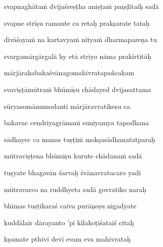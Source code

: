 svapnaghāta\.m dvijaśreṣṭha aniṣṭa\.m paṇḍitaiḥ sadā \veg\dontdisplaylinenum

svapne strīṣu ramante ca retaḥ prakṣarate tataḥ\thinspace{\dandab} \dontdisplaylinenum

divāśaya\.m na kartavya\.m nitya\.m dharmapareṇa tu \veg\dontdisplaylinenum 

svargamārgārgalā hy etā striyo nāma prakīrtitāḥ\thinspace{\dandab} \dontdisplaylinenum


mārjārakabakaśvānagomahīvratapañcakam \veg\dontdisplaylinenum

svaviṣṭāmūtra\.m bhūmīṣu chādayed dvijasattama\thinspace{\dandab} \dontdisplaylinenum

sūryasomānumodanti mārjāravratikeṣu ca \veg\dontdisplaylinenum

bakavac cendriyagrāma\.m suniyamya tapodhana\thinspace{\dandab} \dontdisplaylinenum

sādhayec ca manas tuṣṭi\.m mokṣasādhanatatparaḥ \veg\dontdisplaylinenum

mūtraviṣṭena bhūmīṣu kurute chādana\.m sadā\thinspace{\dandab} \dontdisplaylinenum

tuṣyate bhagavān śarvaḥ śvānavratacaro yadi \veg\dontdisplaylinenum

mūtravarco na ruddhyeta sadā govratiko naraḥ\thinspace{\dandab} \dontdisplaylinenum

bhīmas tuṣṭikaraś caiva purāṇeṣu nigadyate \veg\dontdisplaylinenum

kuddālair dārayanto 'pi kīlakoṭiśataiś citaḥ\thinspace{\dandab} \dontdisplaylinenum

kṣamate pthivī devī evam eva mahīvrataḥ \veg\dontdisplaylinenum

